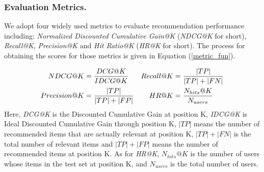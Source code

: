 %


%

\subsubsection{Evaluation Metrics.}\label{evalMetric}
%
We adopt four widely used metrics to evaluate recommendation performance including: 
\textit{Normalized Discounted Cumulative Gain@K} (\textit{NDCG@K} for short), 
\textit{Recall@K}, \textit{Precision@K} and \textit{Hit Ratio@K} (\textit{HR@K} for short).
%
The process for obtaining the scores for those metrics is given in Equation (\ref{metric_fun}).

   
\begin{align}   \label{metric_fun}
	 NDCG@K &= \frac{DCG@K}{IDCG@K} & Recall@K &= \frac{\left| TP \right|}{\left| TP \right| + \left| FN \right|} \notag \\
	 Precision@K &= \frac{\left| TP \right|}{\left| TP \right| + \left| FP \right|} & HR@K &=  \frac{N_{hits} @K}{N_{users}}
\end{align}
Here, \textit{DCG@K} is the  Discounted Cumulative Gain at position K, \textit{IDCG@K} is Ideal Discounted Cumulative Gain through position K, $\left| TP \right|$ means the number of recommended items that are actually relevant at position K, $\left| TP \right| + \left| FN \right|$ is the total number of relevant items and  $\left| TP \right| + \left| FP \right|$ means the number of recommended items at position K. As for \textit{HR@K}, $N_{hits} @K$ is the number of users whose items in the test set at position K, and $N_{users}$ is the total number of users.

